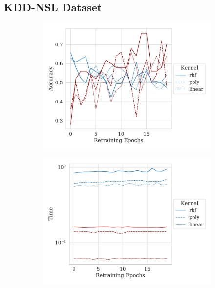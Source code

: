 \documentclass[fonts]{icst}
\begin{document}
\clearpage
\begin{appendices}
\onecolumn
\section{KDD-NSL Dataset}
\label{appendix-1}
\appendix
\begin{figure}[h!]
     \centering
     \begin{subfigure}{0.47\textwidth}
         \centering
         \includegraphics[width=\textwidth]{./kdd-nsl/retrain_accuracy.pdf}
     \end{subfigure}
     \hfill
     \begin{subfigure}{0.47\textwidth}
         \centering
         \includegraphics[width=\textwidth]{./kdd-nsl/retrain_time.pdf}

\end{subfigure}
\end{figure}
\end{appendices}
\end{document}
